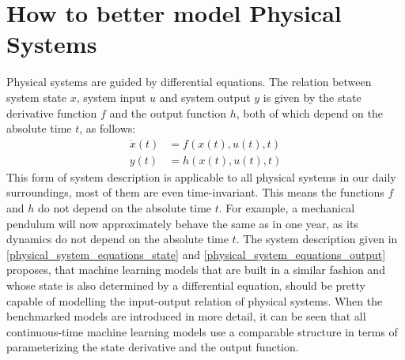 \documentclass[draft,final]{vutinfth} %
\begin{document}
    \section{How to better model Physical Systems} \label{physical_systems}
    Physical systems are guided by differential equations. The relation between system state $x$, system input $u$ and system output $y$ is given by the state derivative function $f$ and the output function $h$, both of which depend on the absolute time $t$, as follows:
    \begin{align} 
        \label{physical_system_equations_state}
        \dot x(t) &= f(x(t),u(t),t) \\
        \label{physical_system_equations_output}
        y(t) &= h(x(t),u(t),t)
    \end{align}
    This form of system description is applicable to all physical systems in our daily surroundings, most of them are even time-invariant. 
    This means the functions $f$ and $h$ do not depend on the absolute time $t$.
    For example, a mechanical pendulum will now approximately behave the same as in one year, as its dynamics do not depend on the absolute time $t$.
    The system description given in \ref{physical_system_equations_state} and \ref{physical_system_equations_output} proposes, that machine learning models that are built in a similar fashion and whose state is also determined by a differential equation, should be pretty capable of modelling the input-output relation of physical systems.
    When the benchmarked models are introduced in more detail, it can be seen that all continuous-time machine learning models use a comparable structure in terms of parameterizing the state derivative and the output function.
    
\end{document}

